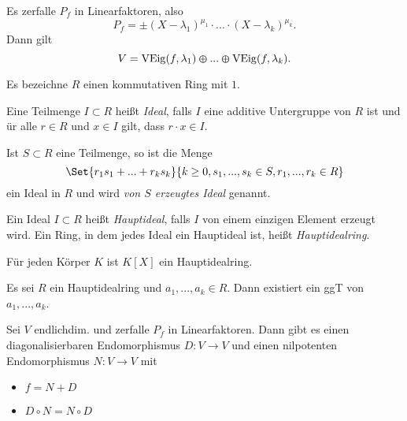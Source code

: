 \documentclass{cheat-sheet}
\DeclareMathOperator{\VEig}{VEig}
\begin{document}
\begin{satz}
  Es zerfalle $P_f$ in Linearfaktoren, also
  \[ P_f = \pm (X - \lambda_1)^{\mu_1} \cdot ... \cdot (X - \lambda_k)^{\mu_k}. \]
  Dann gilt
  \[ V = \VEig(f, \lambda_1) \varoplus ... \varoplus \VEig(f, \lambda_k). \]
\end{satz}

\begin{nota}
  Es bezeichne $R$ einen kommutativen Ring mit $1$.
\end{nota}

\begin{defn}
  Eine Teilmenge $I \subset R$ heißt \emph{Ideal}, falls $I$ eine additive Untergruppe von $R$ ist und ür alle $r \in R$ und $x \in I$ gilt, dass $r \cdot x \in I$.
\end{defn}

\begin{defn}
  Ist $S \subset R$ eine Teilmenge, so ist die Menge
  \[ \Set{ r_1s_1 + ... + r_ks_k }{ k \ge 0, s_1, ..., s_k \in S, r_1, ..., r_k \in R } \]
  ein Ideal in $R$ und wird \emph{von $S$ erzeugtes Ideal} genannt.
\end{defn}

\begin{defn}
  Ein Ideal $I \subset R$ heißt \emph{Hauptideal}, falls $I$ von einem einzigen Element erzeugt wird. Ein Ring, in dem jedes Ideal ein Hauptideal ist, heißt \emph{Hauptidealring}.
\end{defn}

\begin{satz}
Für jeden Körper $K$ ist $K[X]$ ein Hauptidealring.
\end{satz}


\begin{satz}
  Es sei $R$ ein Hauptidealring und $a_1, ..., a_k \in R$. Dann existiert ein ggT von $a_1, ..., a_k$.
\end{satz}

\begin{satz}
  Sei $V$ endlichdim. und zerfalle $P_f$ in Linearfaktoren. Dann gibt es einen diagonalisierbaren Endomorphismus $D : V \to V$ und einen nilpotenten Endomorphismus $N : V \to V$ mit
  \begin{itemize}
    \item $f = N + D$
    \item $D \circ N = N \circ D$
  \end{itemize}
\end{satz}
\end{document}
